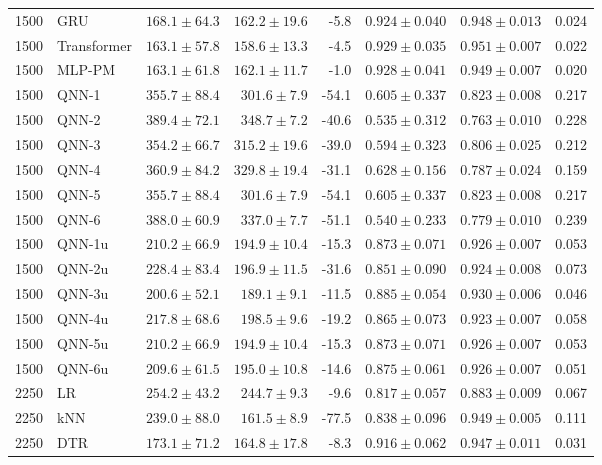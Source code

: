 \begin{longtable}{rlrrrrrr}
1500 & GRU & $168.1 \pm 64.3$ & $162.2 \pm 19.6$ & -5.8 & $0.924 \pm 0.040$ & $0.948 \pm 0.013$ & 0.024 \\
1500 & Transformer & $163.1 \pm 57.8$ & $158.6 \pm 13.3$ & -4.5 & $0.929 \pm 0.035$ & $0.951 \pm 0.007$ & 0.022 \\
1500 & MLP-PM & $163.1 \pm 61.8$ & $162.1 \pm 11.7$ & -1.0 & $0.928 \pm 0.041$ & $0.949 \pm 0.007$ & 0.020 \\
1500 & QNN-1 & $355.7 \pm 88.4$ & $301.6 \pm 7.9$ & -54.1 & $0.605 \pm 0.337$ & $0.823 \pm 0.008$ & 0.217 \\
1500 & QNN-2 & $389.4 \pm 72.1$ & $348.7 \pm 7.2$ & -40.6 & $0.535 \pm 0.312$ & $0.763 \pm 0.010$ & 0.228 \\
1500 & QNN-3 & $354.2 \pm 66.7$ & $315.2 \pm 19.6$ & -39.0 & $0.594 \pm 0.323$ & $0.806 \pm 0.025$ & 0.212 \\
1500 & QNN-4 & $360.9 \pm 84.2$ & $329.8 \pm 19.4$ & -31.1 & $0.628 \pm 0.156$ & $0.787 \pm 0.024$ & 0.159 \\
1500 & QNN-5 & $355.7 \pm 88.4$ & $301.6 \pm 7.9$ & -54.1 & $0.605 \pm 0.337$ & $0.823 \pm 0.008$ & 0.217 \\
1500 & QNN-6 & $388.0 \pm 60.9$ & $337.0 \pm 7.7$ & -51.1 & $0.540 \pm 0.233$ & $0.779 \pm 0.010$ & 0.239 \\
1500 & QNN-1u & $210.2 \pm 66.9$ & $194.9 \pm 10.4$ & -15.3 & $0.873 \pm 0.071$ & $0.926 \pm 0.007$ & 0.053 \\
1500 & QNN-2u & $228.4 \pm 83.4$ & $196.9 \pm 11.5$ & -31.6 & $0.851 \pm 0.090$ & $0.924 \pm 0.008$ & 0.073 \\
1500 & QNN-3u & $200.6 \pm 52.1$ & $189.1 \pm 9.1$ & -11.5 & $0.885 \pm 0.054$ & $0.930 \pm 0.006$ & 0.046 \\
1500 & QNN-4u & $217.8 \pm 68.6$ & $198.5 \pm 9.6$ & -19.2 & $0.865 \pm 0.073$ & $0.923 \pm 0.007$ & 0.058 \\
1500 & QNN-5u & $210.2 \pm 66.9$ & $194.9 \pm 10.4$ & -15.3 & $0.873 \pm 0.071$ & $0.926 \pm 0.007$ & 0.053 \\
1500 & QNN-6u & $209.6 \pm 61.5$ & $195.0 \pm 10.8$ & -14.6 & $0.875 \pm 0.061$ & $0.926 \pm 0.007$ & 0.051 \\
\midrule
2250 & LR & $254.2 \pm 43.2$ & $244.7 \pm 9.3$ & -9.6 & $0.817 \pm 0.057$ & $0.883 \pm 0.009$ & 0.067 \\
2250 & kNN & $239.0 \pm 88.0$ & $161.5 \pm 8.9$ & -77.5 & $0.838 \pm 0.096$ & $0.949 \pm 0.005$ & 0.111 \\
2250 & DTR & $173.1 \pm 71.2$ & $164.8 \pm 17.8$ & -8.3 & $0.916 \pm 0.062$ & $0.947 \pm 0.011$ & 0.031 \\

\end{longtable}
